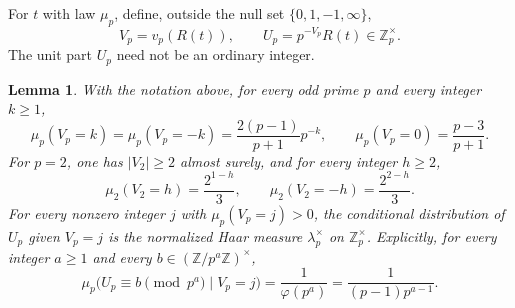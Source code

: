 \documentclass[twoside]{aomart}
\theoremstyle{paperplain}
\newtheorem{lemma}[theorem]{Lemma}
\theoremstyle{paperdefinition}
\newcommand{\Z}{\mathbb Z}
\numberwithin{equation}{section}
\begin{document}
For $t$ with law $\mu_p$, define, outside the null set
$\{0,1,-1,\infty\}$,
\begin{equation*}
 V_p=v_p(R(t)),\qquad U_p=p^{-V_p}R(t)\in\Z_p^\times.
\end{equation*}
The unit part $U_p$ need not be an ordinary integer.

\begin{samepage}
\begin{lemma}
\label{ar:shells}
With the notation above, for every odd prime $p$ and
every integer $k\ge1$,
\begin{equation}
 \mu_p(V_p=k)=\mu_p(V_p=-k)=\frac{2(p-1)}{p+1}p^{-k},\qquad
 \mu_p(V_p=0)=\frac{p-3}{p+1}.
 \label{ar:odd-shells}
\end{equation}
For $p=2$, one has $|V_2|\ge2$ almost surely, and for
every integer $h\ge2$,
\begin{equation}
 \mu_2(V_2=h)=\frac{2^{1-h}}3,\qquad
 \mu_2(V_2=-h)=\frac{2^{2-h}}3.
 \label{ar:dyadic-shells}
\end{equation}
For every nonzero integer $j$ with $\mu_p(V_p=j)>0$,
the conditional distribution of $U_p$ given $V_p=j$ is
the normalized Haar measure $\lambda_p^\times$ on
$\Z_p^\times$. Explicitly, for every integer $a\ge1$ and
every $b\in(\Z/p^a\Z)^\times$,
\begin{equation}
 \mu_p\bigl(U_p\equiv b\pmod{p^a}\mid V_p=j\bigr)
   =\frac1{\varphi(p^a)}
   =\frac1{(p-1)p^{a-1}}.
 \label{ar:shell-unit-law}
\end{equation}
\end{lemma}
\end{samepage}
\end{document}
